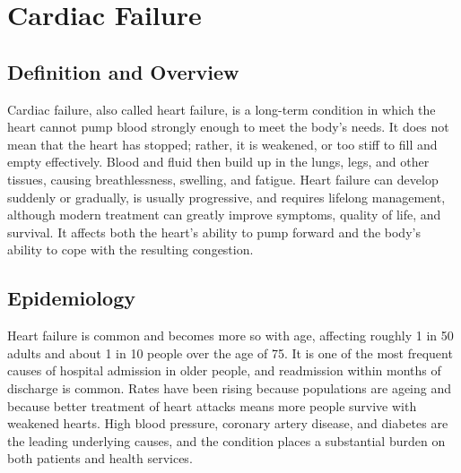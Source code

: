 \chapter{Cardiac Failure}

\section*{Definition and Overview}
Cardiac failure, also called heart failure, is a long-term condition in which the heart cannot pump blood strongly enough to meet the body's needs. It does not mean that the heart has stopped; rather, it is weakened, or too stiff to fill and empty effectively. Blood and fluid then build up in the lungs, legs, and other tissues, causing breathlessness, swelling, and fatigue. Heart failure can develop suddenly or gradually, is usually progressive, and requires lifelong management, although modern treatment can greatly improve symptoms, quality of life, and survival. It affects both the heart's ability to pump forward and the body's ability to cope with the resulting congestion.

\section*{Epidemiology}
Heart failure is common and becomes more so with age, affecting roughly 1 in 50 adults and about 1 in 10 people over the age of 75. It is one of the most frequent causes of hospital admission in older people, and readmission within months of discharge is common. Rates have been rising because populations are ageing and because better treatment of heart attacks means more people survive with weakened hearts. High blood pressure, coronary artery disease, and diabetes are the leading underlying causes, and the condition places a substantial burden on both patients and health services.

